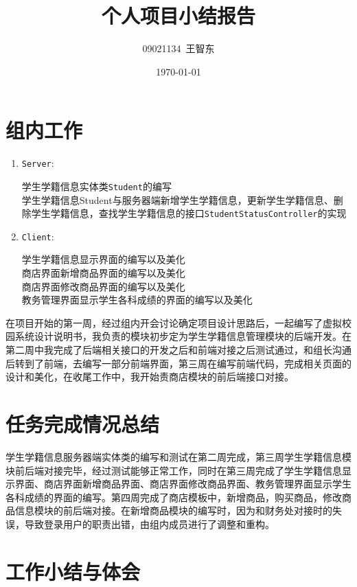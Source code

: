 \documentclass{article}
\title{个人项目小结报告}
\author{09021134~王智东}
\date{\today}
\begin{document}
\maketitle

\section{组内工作}
\begin{enumerate}
    \item
          \texttt{Server}:

          学生学籍信息实体类\texttt{Student}的编写\\
          学生学籍信息Student与服务器端新增学生学籍信息，更新学生学籍信息、删除学生学籍信息，查找学生学籍信息的接口\texttt{StudentStatusController}的实现

    \item
          \texttt{Client}:


          学生学籍信息显示界面的编写以及美化\\
          商店界面新增商品界面的编写以及美化\\
          商店界面修改商品界面的编写以及美化\\
          教务管理界面显示学生各科成绩的界面的编写以及美化
\end{enumerate}

在项目开始的第一周，经过组内开会讨论确定项目设计思路后，一起编写了虚拟校园系统设计说明书，我负责的模块初步定为学生学籍信息管理模块的后端开发。在第二周中我完成了后端相关接口的开发之后和前端对接之后测试通过，和组长沟通后转到了前端，去编写一部分前端界面，第三周在编写前端代码，完成相关页面的设计和美化，在收尾工作中，我开始责商店模块的前后端接口对接。
\section{任务完成情况总结}

学生学籍信息服务器端实体类的编写和测试在第二周完成，第三周学生学籍信息模块前后端对接完毕，经过测试能够正常工作，同时在第三周完成了学生学籍信息显示界面、商店界面新增商品界面、商店界面修改商品界面、教务管理界面显示学生各科成绩的界面的编写。第四周完成了商店模板中，新增商品，购买商品，修改商品信息模块的前后端对接。在新增商品模块的编写时，因为和财务处对接时的失误，导致登录用户的职责出错，由组内成员进行了调整和重构。

\section{工作小结与体会}
\end{document}
